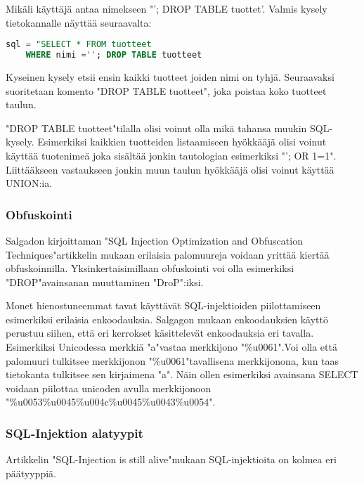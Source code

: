 \documentclass[finnish]{tktltiki2}
\theoremstyle{definition}
\theoremstyle{remark}
\begin{document}
	Mikäli käyttäjä antaa nimekseen "'; DROP TABLE tuottet'. Valmis kysely tietokannalle näyttää seuraavalta:
	
	\begin{lstlisting}[language=sql]
	sql = "SELECT * FROM tuotteet
	WHERE nimi =''; DROP TABLE tuotteet     
	\end{lstlisting}
	
	Kyseinen kysely etsii ensin kaikki tuotteet joiden nimi on tyhjä. Seuraavaksi suoritetaan komento "DROP TABLE tuotteet", joka poistaa koko tuotteet taulun.
	
	"DROP TABLE tuotteet"\space tilalla olisi voinut olla mikä tahansa muukin SQL-kysely. Esimerkiksi kaikkien tuotteiden listaamiseen hyökkääjä olisi voinut käyttää tuotenimeä joka sisältää jonkin tautologian esimerkiksi "'; OR 1=1". Liittääkseen vastaukseen jonkin muun taulun hyökkääjä olisi voinut käyttää UNION:ia.
	
	\subsubsection{Obfuskointi}
	
	Salgadon kirjoittaman "SQL Injection Optimization and Obfuscation Techniques"\cite{encoding}\space artikkelin mukaan erilaisia palomuureja voidaan yrittää kiertää obfuskoinnilla. Yksinkertaisimillaan obfuskointi voi olla esimerkiksi "DROP"\space avainsanan muuttaminen "DroP":iksi. 
	
	Monet hienostuneemmat tavat käyttävät SQL-injektioiden piilottamiseen esimerkiksi erilaisia enkoodauksia. Salgagon mukaan enkoodauksien käyttö perustuu siihen, että eri kerrokset käsittelevät enkoodauksia eri tavalla. Esimerkiksi Unicodessa merkkiä "a"\space vastaa merkkijono "\%u0061".\space Voi olla että palomuuri tulkitsee merkkijonon "\%u0061"\space tavallisena merkkijonona, kun taas tietokanta tulkitsee sen kirjaimena "a". Näin ollen esimerkiksi avainsana SELECT voidaan piilottaa unicoden avulla merkkijonoon "\%u0053\%u0045\%u004c\%u0045\%u0043\%u0054".
	
	\subsubsection{SQL-Injektion alatyypit}
	Artikkelin "SQL-Injection is still alive"\space  mukaan SQL-injektioita on kolmea eri päätyyppiä\cite{still-alive}.
	
\end{document}

